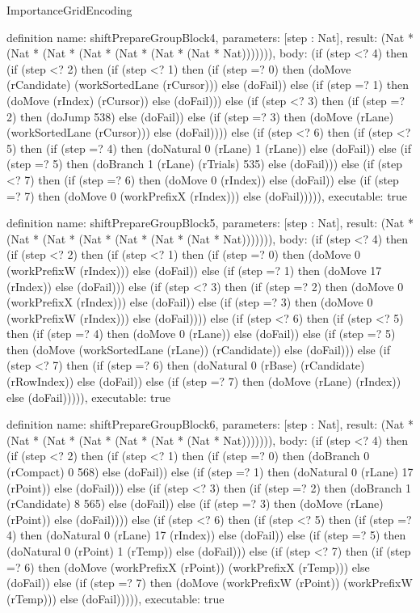 \begin{lexlean}{ImportanceGridEncoding}
\begin{semanticmodule}
definition{
  name: shiftPrepareGroupBlock4,
  parameters: [step : Nat],
  result: (Nat * (Nat * (Nat * (Nat * (Nat * (Nat * (Nat * Nat))))))),
  body: (if (step <? 4) then
      (if (step <? 2) then
      (if (step <? 1) then
      (if (step =? 0) then (doMove (rCandidate) (workSortedLane (rCursor))) else (doFail)) else
      (if (step =? 1) then (doMove (rIndex) (rCursor)) else (doFail))) else
      (if (step <? 3) then
      (if (step =? 2) then (doJump 538) else (doFail)) else
      (if (step =? 3) then (doMove (rLane) (workSortedLane (rCursor))) else (doFail)))) else
      (if (step <? 6) then
      (if (step <? 5) then
      (if (step =? 4) then (doNatural 0 (rLane) 1 (rLane)) else (doFail)) else
      (if (step =? 5) then (doBranch 1 (rLane) (rTrials) 535) else (doFail))) else
      (if (step <? 7) then
      (if (step =? 6) then (doMove 0 (rIndex)) else (doFail)) else
      (if (step =? 7) then (doMove 0 (workPrefixX (rIndex))) else (doFail))))),
  executable: true
}

definition{
  name: shiftPrepareGroupBlock5,
  parameters: [step : Nat],
  result: (Nat * (Nat * (Nat * (Nat * (Nat * (Nat * (Nat * Nat))))))),
  body: (if (step <? 4) then
      (if (step <? 2) then
      (if (step <? 1) then
      (if (step =? 0) then (doMove 0 (workPrefixW (rIndex))) else (doFail)) else
      (if (step =? 1) then (doMove 17 (rIndex)) else (doFail))) else
      (if (step <? 3) then
      (if (step =? 2) then (doMove 0 (workPrefixX (rIndex))) else (doFail)) else
      (if (step =? 3) then (doMove 0 (workPrefixW (rIndex))) else (doFail)))) else
      (if (step <? 6) then
      (if (step <? 5) then
      (if (step =? 4) then (doMove 0 (rLane)) else (doFail)) else
      (if (step =? 5) then (doMove (workSortedLane (rLane)) (rCandidate)) else (doFail))) else
      (if (step <? 7) then
      (if (step =? 6) then (doNatural 0 (rBase) (rCandidate) (rRowIndex)) else (doFail)) else
      (if (step =? 7) then (doMove (rLane) (rIndex)) else (doFail))))),
  executable: true
}

definition{
  name: shiftPrepareGroupBlock6,
  parameters: [step : Nat],
  result: (Nat * (Nat * (Nat * (Nat * (Nat * (Nat * (Nat * Nat))))))),
  body: (if (step <? 4) then
      (if (step <? 2) then
      (if (step <? 1) then
      (if (step =? 0) then (doBranch 0 (rCompact) 0 568) else (doFail)) else
      (if (step =? 1) then (doNatural 0 (rLane) 17 (rPoint)) else (doFail))) else
      (if (step <? 3) then
      (if (step =? 2) then (doBranch 1 (rCandidate) 8 565) else (doFail)) else
      (if (step =? 3) then (doMove (rLane) (rPoint)) else (doFail)))) else
      (if (step <? 6) then
      (if (step <? 5) then
      (if (step =? 4) then (doNatural 0 (rLane) 17 (rIndex)) else (doFail)) else
      (if (step =? 5) then (doNatural 0 (rPoint) 1 (rTemp)) else (doFail))) else
      (if (step <? 7) then
      (if (step =? 6) then (doMove (workPrefixX (rPoint)) (workPrefixX (rTemp))) else (doFail)) else
      (if (step =? 7) then (doMove (workPrefixW (rPoint)) (workPrefixW (rTemp))) else (doFail))))),
  executable: true
}


\end{semanticmodule}
\end{lexlean}
